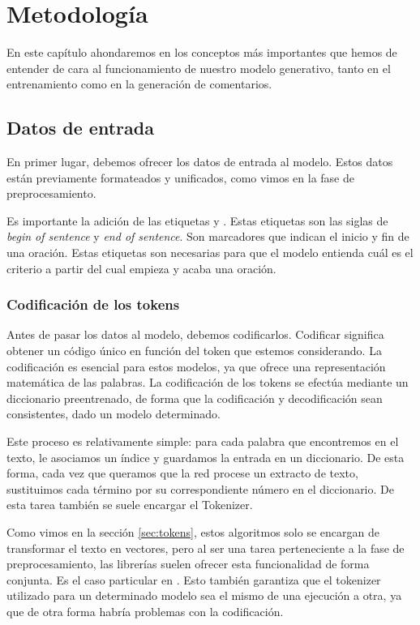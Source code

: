 \chapter{Metodología}

En este capítulo ahondaremos en los conceptos más importantes que hemos de entender de cara al funcionamiento de nuestro modelo generativo, tanto en el entrenamiento como en la generación de comentarios.



\section{Datos de entrada}
En primer lugar, debemos ofrecer los datos de entrada al modelo. Estos datos están previamente formateados y unificados, como vimos en la fase de preprocesamiento.

Es importante la adición de las etiquetas  y . Estas etiquetas son las siglas de \textit{begin of sentence} y \textit{end of sentence}. Son marcadores que indican el inicio y fin de una oración. Estas etiquetas son necesarias para que el modelo entienda cuál es el criterio a partir del cual empieza y acaba una oración.

\subsection{Codificación de los tokens}
Antes de pasar los datos al modelo, debemos codificarlos. Codificar significa obtener un código único en función del token que estemos considerando. La codificación es esencial para estos modelos, ya que ofrece una representación matemática de las palabras. La codificación de los tokens se efectúa mediante un diccionario preentrenado, de forma que la codificación y decodificación sean consistentes, dado un modelo determinado.

Este proceso es relativamente simple: para cada palabra que encontremos en el texto, le asociamos un índice y guardamos la entrada en un diccionario. De esta forma, cada vez que queramos que la red procese un extracto de texto, sustituimos cada término por su correspondiente número en el diccionario. De esta tarea también se suele encargar el Tokenizer. 

Como vimos en la sección \ref{sec:tokens}, estos algoritmos solo se encargan de transformar el texto en vectores, pero al ser una tarea perteneciente a la fase de preprocesamiento, las librerías suelen ofrecer esta funcionalidad de forma conjunta. Es el caso particular en . Esto también garantiza que el tokenizer utilizado para un determinado modelo sea el mismo de una ejecución a otra, ya que de otra forma habría problemas con la codificación.

